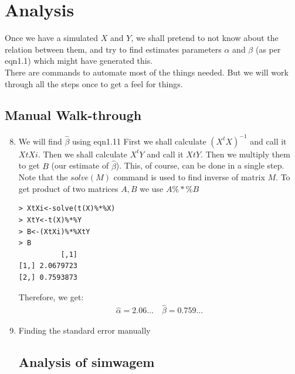 \documentclass[notoc]{tufte-book}
\begin{document}
\section{Analysis}
Once we have a simulated $X$ and $Y$, we shall pretend to not know about the relation between them, and try to find estimates parameters $\alpha$ and $\beta$ (as per eqn1.1) which might have generated this.\\\noindent There are commands to automate most of the things needed. But we will work through all the steps once to get a feel for things.
\subsection{Manual Walk-through}
\begin{enumerate}
    \setcounter{enumi}{7}
    \item We will find $\widehat\beta$ using eqn1.11 First we shall calculate $(X^tX)^{-1}$ and call it $XtXi$. Then we shall calculate $X^tY$ and call it $XtY$. Then we multiply them to get $B$ (our estimate of $\widehat\beta$). This, of course, can be done in a single step. Note that the $solve(M)$ command is used to find inverse of matrix $M$. To get product of two matrices $A,B$ we use $A\%*\%B$
    \begin{lstlisting}
> XtXi<-solve(t(X)%*%X)
> XtY<-t(X)%*%Y
> B<-(XtXi)%*%XtY
> B
          [,1]
[1,] 2.0679723
[2,] 0.7593873
    \end{lstlisting}
Therefore, we get:
\begin{align}
    \widehat\alpha=2.06\hdots\quad\widehat\beta=0.759\hdots
\end{align}
\item{Finding the standard error manually}

\subsection{Analysis of simwagem}

    
\end{enumerate}







\backmatter





\printindex
\end{document}
